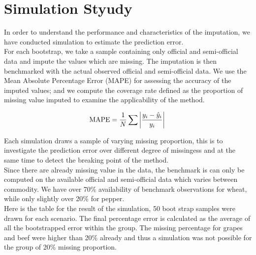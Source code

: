 \documentclass[nojss]{jss}\usepackage[]{graphicx}\usepackage[]{color}
\begin{document}
\FloatBarrier
\section{Simulation Styudy}

In order to understand the performance and characteristics of the
imputation, we have conducted simulation to estimate the prediction
error.\\

For each bootstrap, we take a sample containing only official and
semi-official data and impute the values which are missing. The
imputation is then benchmarked with the actual observed official and
semi-official data. We use the Mean Absolute Percentage Error (MAPE)
for assessing the accuracy of the imputed values; and we compute the
coverage rate defined as the proportion of missing value imputed to
examine the applicability of the method.

\begin{equation}
  \text{MAPE} = \frac{1}{N} \sum \left|\frac{y_i -
    \hat{y}_i}{y_i}\right|\\
\end{equation}


Each simulation draws a sample of varying missing proportion, this is
to investigate the prediction error over different degree of
missingess and at the same time to detect the breaking point of the
method.\\

Since there are already missing value in the data, the benchmark is
can only be computed on the available official and semi-official data
which varies between commodity. We have over 70\% availability of
benchmark observations for wheat, while only slightly over 20\% for
pepper.\\


Here is the table for the result of the simulation, 50 boot strap
samples were drawn for each scenario. The final percentage error is
calculated as the average of all the bootstrapped error within the
group. The missing percentage for grapes and beef were higher than
20\% already and thus a simulation was not possible for the group of
20\% missing proportion.
\end{document}
